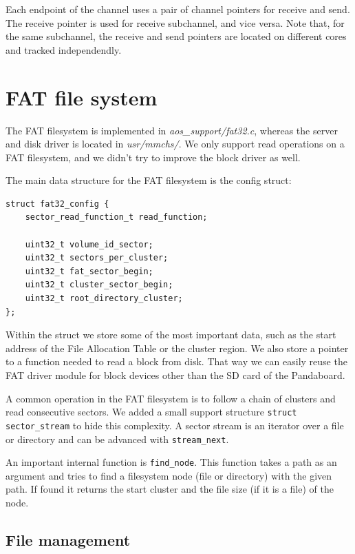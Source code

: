 \documentclass[a4paper,10pt]{article}
\newcommand{\filepath}[1]{\emph{ #1}}
\begin{document}
	Each endpoint of the channel uses a pair of channel pointers for receive and send. 
	The receive pointer is used for receive subchannel, and vice versa.
	Note that, for the same subchannel, the receive and send pointers are located on different cores and tracked independendly.
	


\section{FAT file system}

The FAT filesystem is implemented in \filepath{aos\_support/fat32.c}, whereas the server and disk driver is located in \filepath{usr/mmchs/}.
We only support read operations on a FAT filesystem, and we didn't try to improve the block driver as well.

The main data structure for the FAT filesystem is the config struct:

\begin{lstlisting}
struct fat32_config {
    sector_read_function_t read_function;

    uint32_t volume_id_sector;
    uint32_t sectors_per_cluster;
    uint32_t fat_sector_begin;
    uint32_t cluster_sector_begin;
    uint32_t root_directory_cluster;
};
\end{lstlisting}

Within the struct we store some of the most important data, such as the start address of the File Allocation Table or the cluster region.
We also store a pointer to a function needed to read a block from disk.
That way we can easily reuse the FAT driver module for block devices other than the SD card of the Pandaboard.

A common operation in the FAT filesystem is to follow a chain of clusters and read consecutive sectors.
We added a small support structure \lstinline!struct sector_stream! to hide this complexity.
A sector stream is an iterator over a file or directory and can be advanced with \lstinline!stream_next!.

An important internal function is \lstinline!find_node!.
This function takes a path as an argument and tries to find a filesystem node (file or directory) with the given path.
If found it returns the start cluster and the file size (if it is a file) of the node.

\subsection{File management}
\end{document}
